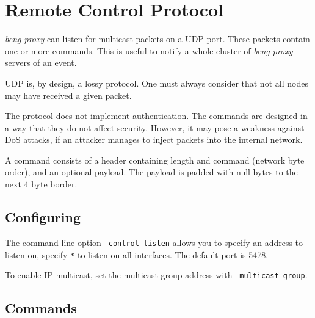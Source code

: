 \documentclass[a4paper,12pt]{article}
\begin{document}
\section{Remote Control Protocol}

\emph{beng-proxy} can listen for multicast packets on a UDP port.
These packets contain one or more commands.  This is useful to notify
a whole cluster of \emph{beng-proxy} servers of an event.

UDP is, by design, a lossy protocol.  One must always consider that
not all nodes may have received a given packet.

The protocol does not implement authentication.  The commands are
designed in a way that they do not affect security.  However, it may
pose a weakness against DoS attacks, if an attacker manages to inject
packets into the internal network.

A command consists of a header containing length and command (network
byte order), and an optional payload.  The payload is padded with null
bytes to the next 4 byte border.

\subsection{Configuring}

The command line option \texttt{--control-listen} allows you to
specify an address to listen on, specify \texttt{*} to listen on all
interfaces.  The default port is 5478.

To enable IP multicast, set the multicast group address with
\texttt{--multicast-group}.

\subsection{Commands}
\end{document}
